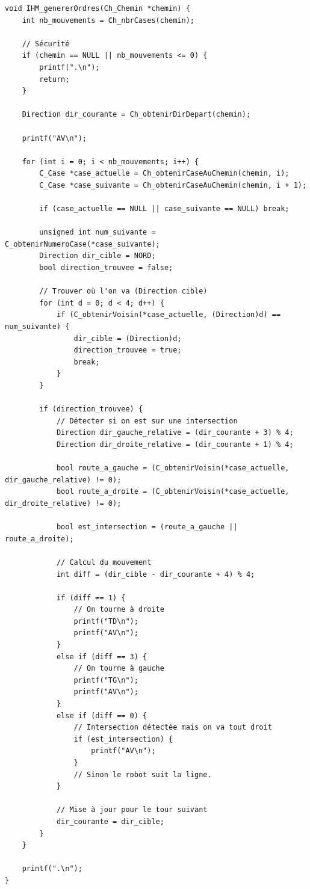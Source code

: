 \begin{lstlisting}[caption={IHM\_genererOrdres}]
void IHM_genererOrdres(Ch_Chemin *chemin) {
    int nb_mouvements = Ch_nbrCases(chemin);
    
    // Sécurité
    if (chemin == NULL || nb_mouvements <= 0) {
        printf(".\n");
        return;
    }

    Direction dir_courante = Ch_obtenirDirDepart(chemin);

    printf("AV\n");

    for (int i = 0; i < nb_mouvements; i++) {
        C_Case *case_actuelle = Ch_obtenirCaseAuChemin(chemin, i);
        C_Case *case_suivante = Ch_obtenirCaseAuChemin(chemin, i + 1);

        if (case_actuelle == NULL || case_suivante == NULL) break;

        unsigned int num_suivante = C_obtenirNumeroCase(*case_suivante);
        Direction dir_cible = NORD;
        bool direction_trouvee = false;

        // Trouver où l'on va (Direction cible)
        for (int d = 0; d < 4; d++) {
            if (C_obtenirVoisin(*case_actuelle, (Direction)d) == num_suivante) {
                dir_cible = (Direction)d;
                direction_trouvee = true;
                break;
            }
        }

        if (direction_trouvee) {
            // Détecter si on est sur une intersection
            Direction dir_gauche_relative = (dir_courante + 3) % 4;
            Direction dir_droite_relative = (dir_courante + 1) % 4;

            bool route_a_gauche = (C_obtenirVoisin(*case_actuelle, dir_gauche_relative) != 0);
            bool route_a_droite = (C_obtenirVoisin(*case_actuelle, dir_droite_relative) != 0);
            
            bool est_intersection = (route_a_gauche || route_a_droite);

            // Calcul du mouvement
            int diff = (dir_cible - dir_courante + 4) % 4;

            if (diff == 1) {
                // On tourne à droite
                printf("TD\n");
                printf("AV\n");
            } 
            else if (diff == 3) {
                // On tourne à gauche
                printf("TG\n");
                printf("AV\n");
            } 
            else if (diff == 0) {
                // Intersection détectée mais on va tout droit
                if (est_intersection) {
                    printf("AV\n");
                }
                // Sinon le robot suit la ligne.
            }

            // Mise à jour pour le tour suivant
            dir_courante = dir_cible;
        }
    }

    printf(".\n");
}
\end{lstlisting}